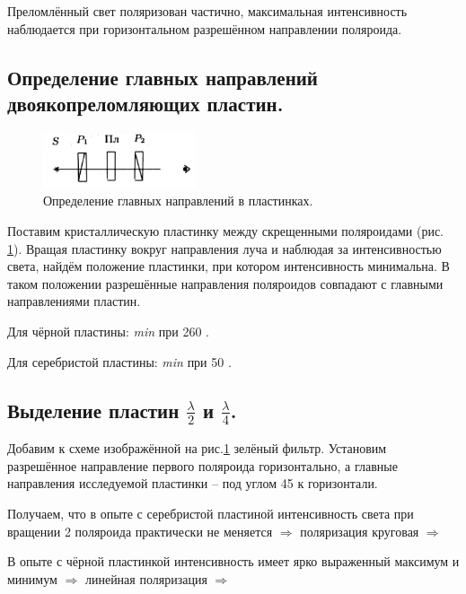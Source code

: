 \documentclass[a4paper, 12pt, twoside]{article}
\begin{document}
Преломлённый свет поляризован частично, максимальная интенсивность наблюдается при горизонтальном разрешённом направлении поляроида.

\subsection{Определение главных направлений двоякопреломляющих пластин.} 
	
	\begin{figure}[H]
		\centering
		\includegraphics[width =  0.4\textwidth]{img3}
		\caption{Определение главных направлений в пластинках.}
		\label{img3}
	\end{figure}

Поставим кристаллическую пластинку между скрещенными поляроидами (рис. \ref{img3}). Вращая пластинку вокруг направления луча и наблюдая за интенсивностью света, найдём положение пластинки, при котором интенсивность минимальна. В таком положении разрешённые направления поляроидов совпадают с главными направлениями пластин.

Для чёрной пластины: \textit{min} при 260 \degree.

Для серебристой пластины: \textit{min} при 50 \degree.

\subsection{Выделение пластин $\frac{\lambda}{2}$ и $\frac{\lambda}{4}$.}

Добавим к схеме изображённой на рис.\ref{img3} зелёный фильтр. Установим разрешённое направление первого поляроида горизонтально, а главные направления исследуемой пластинки -- под углом 45 \degree к горизонтали.

Получаем, что в опыте с серебристой пластиной интенсивность света при вращении 2 поляроида практически не меняется $\Rightarrow$ поляризация круговая $\Rightarrow$ 
\begin{center}
\end{center}

В опыте с чёрной пластинкой интенсивность имеет ярко выраженный максимум и минимум $\Rightarrow$ линейная поляризация $\Rightarrow$
\end{document}
